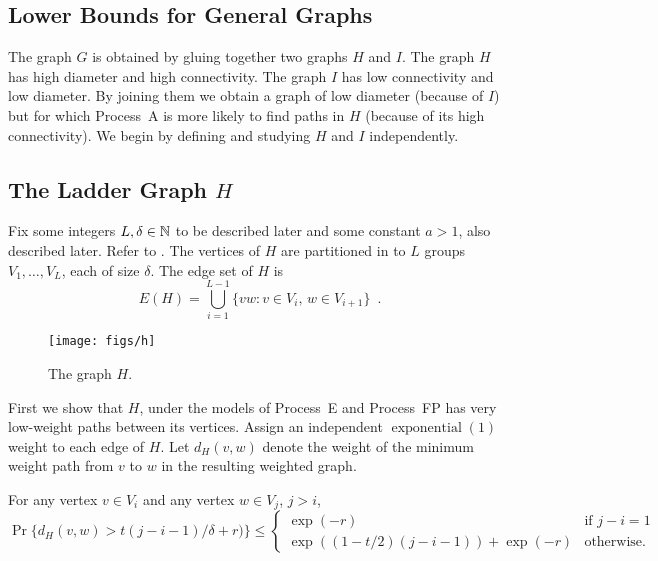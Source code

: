 \documentclass{patmorin}
\DeclareMathOperator{\exponential}{exponential}
\begin{document}
\subsection{Lower Bounds for General Graphs}

The graph $G$ is obtained by gluing together two graphs $H$ and $I$.
The graph $H$ has high diameter and high connectivity.  The graph $I$
has low connectivity and low diameter.  By joining them we obtain a graph
of low diameter (because of $I$) but for which Process~A is more likely
to find paths in $H$ (because of its high connectivity).  We begin by
defining and studying $H$ and $I$ independently.


\subsection{The Ladder Graph $H$}

Fix some integers $L,\delta\in\mathbb{N}$ to be described later and some
constant $a>1$, also described later.  Refer to
.  The vertices of $H$ are partitioned in to $L$ groups
$V_1,\ldots,V_L$, each of size $\delta$. The edge set of $H$ is
\[
   E(H) = \bigcup_{i=1}^{L-1} \{vw : v\in V_{i},\, w\in V_{i+1}\} \enspace .
\]
\begin{figure}
  \begin{center}
    \texttt{[image: figs/h]} 
  \end{center}
  \caption{The graph $H$.}
\end{figure}

First we show that $H$, under the models of Process~E and Process~FP
has very low-weight paths between its vertices.
Assign an independent $\exponential(1)$ weight to each edge of $H$.
Let $d_H(v,w)$ denote the weight of the minimum weight path from $v$
to $w$ in the resulting weighted graph.

\begin{lem}
   For any vertex $v\in V_i$ and any vertex $w\in V_j$, $j>i$,
   \[
       \Pr\{d_H(v,w) > t(j-i-1)/\delta + r) \} \le
       \begin{cases}
           \exp(-r) & \text{if $j-i=1$} \\
           \exp((1-t/2)(j-i-1)) + \exp(-r) & \text{otherwise.}
       \end{cases}
   \]
\end{lem}
\end{document}
